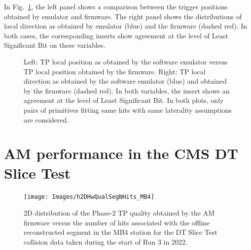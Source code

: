 \documentclass[../main.tex]{subfiles}
\begin{document}
In Fig.~\ref{dts:fig:fwemu_pos_slope}, the left panel shows a comparison between the trigger positions obtained by emulator and firmware. The right panel shows the distributions of local direction as obtained by emulator (blue) and the firmware (dashed red). In both cases, the corresponding inserts show agreement at the level of Least Significant Bit on these variables.

\begin{figure}[h!]
\begin{center}
\end{center}
\caption[Firmware-emulator position and direction differences]{Left: TP local position as obtained by the software emulator versus TP local position obtained by the firmware. Right: TP local direction as obtained by the software emulator (blue) and obtained by the firmware (dashed red). In both variables, the insert shows an agreement at the level of Least Significant Bit. In both plots, only pairs of primitives fitting same hits with same laterality assumptions are considered.}
\label{dts:fig:fwemu_pos_slope}
\end{figure}


\section{AM performance in the CMS DT Slice Test}
\label{hh:sec:st}


\begin{figure}[t!]
\begin{center}
\texttt{[image: Images/h2DHwQualSegNHits\_MB4]}
\end{center}
\caption[Comparison between the quality obtained by the AM and the number of hits from the offline segments in the Slice Test]{2D distribution of the Phase-2 TP quality obtained by the AM firmware versus the number of hits associated with the offline reconstructed segment in the MB4 station for the DT Slice Test collision data taken during the start of Run 3 in 2022.}
\label{dts:fig:st_hits}
\end{figure}
\end{document}
